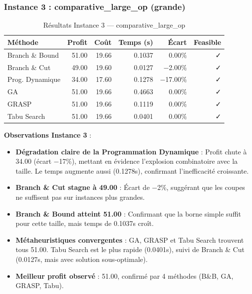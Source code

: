 \documentclass[11pt,a4paper]{article}
\begin{document}
\subsubsection*{Instance 3 : comparative\_large\_op (grande)}

\begin{table}[H]
\centering
\caption{Résultats Instance 3 — comparative\_large\_op}
\begin{tabular}{lrrrrr}
\toprule
\textbf{Méthode} & \textbf{Profit} & \textbf{Coût} & \textbf{Temps (s)} & \textbf{Écart} & \textbf{Feasible} \\
\midrule
Branch \& Bound & 51.00 & 19.66 & 0.1037 & 0.00\% & ✓ \\
Branch \& Cut & 49.00 & 19.60 & 0.0127 & −2.00\% & ✓ \\
Prog. Dynamique & 34.00 & 17.60 & 0.1278 & −17.00\% & ✓ \\
GA & 51.00 & 19.66 & 0.4663 & 0.00\% & ✓ \\
GRASP & 51.00 & 19.66 & 0.1119 & 0.00\% & ✓ \\
Tabu Search & 51.00 & 19.66 & 0.0401 & 0.00\% & ✓ \\
\bottomrule
\end{tabular}
\end{table}

\textbf{Observations Instance 3} :

\begin{itemize}
    \item \textbf{Dégradation claire de la Programmation Dynamique} : Profit chute à 34.00 (écart −17\%), mettant en évidence l'explosion combinatoire avec la taille. Le temps augmente aussi (0.1278s), confirmant l'inefficacité croissante.
    
    \item \textbf{Branch \& Cut stagne à 49.00} : Écart de −2\%, suggérant que les coupes ne suffisent pas sur instances plus grandes.
    
    \item \textbf{Branch \& Bound atteint 51.00} : Confirmant que la borne simple suffit pour cette taille, mais temps de 0.1037s croît.
    
    \item \textbf{Métaheuristiques convergentes} : GA, GRASP et Tabu Search trouvent tous 51.00. Tabu Search est le plus rapide (0.0401s), suivi de Branch \& Cut (0.0127s, mais avec solution sous-optimale).
    
    \item \textbf{Meilleur profit observé} : 51.00, confirmé par 4 méthodes (B\&B, GA, GRASP, Tabu).
\end{itemize}
\end{document}
